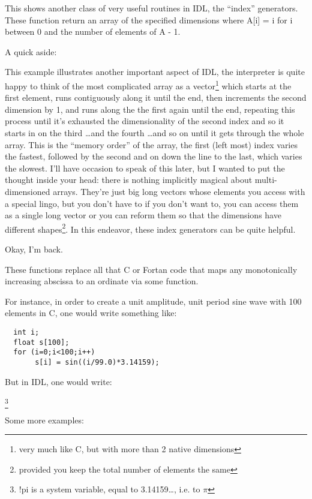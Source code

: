   This shows another class of very useful routines in IDL, the
  ``index'' generators. These function return an array of the
  specified dimensions where A[i] = i for i between 0 and the number
  of elements of A - 1. 

  A quick aside: 
  
  This example illustrates another important aspect of IDL, the
  interpreter is quite happy to think of the most complicated array as
  a vector\footnote{very much like C, but with more than 2 native
  dimensions} which starts at the first element, runs contiguously
  along it until the end, then increments the second dimension by 1,
  and runs along the the first again until the end, repeating this
  process until it's exhausted the dimensionality of the second index
  and so it starts in on the third \ldots and the fourth \ldots and so
  on until it gets through the whole array. This is the ``memory
  order'' of the array, the first (left most) index varies the
  fastest, followed by the second and on down the line to the last,
  which varies the slowest. I'll have occasion to speak of this later,
  but I wanted to put the thought inside your head: there is nothing
  implicitly magical about multi-dimensioned arrays. They're just big
  long vectors whose elements you access with a special lingo, but you
  don't have to if you don't want to, you can access them as a single
  long vector or you can reform them so that the dimensions have
  different shapes\footnote{provided you keep the total number of
  elements the same}.  In this endeavor, these index generators can be
  quite helpful.

  Okay, I'm back.

  These functions replace all that C or Fortan code that maps any
  monotonically increasing abscissa to an ordinate via some
  function. 

  For instance, in order to create a unit amplitude, unit period sine
  wave with 100 elements in C, one would write something like:

\begin{verbatim}
  int i;
  float s[100];
  for (i=0;i<100;i++)
       s[i] = sin((i/99.0)*3.14159);
\end{verbatim}


But in IDL, one would write:


    \footnote{!pi is a system
  variable, equal to 3.14159\ldots, i.e. to $\pi$}

Some more examples: 

